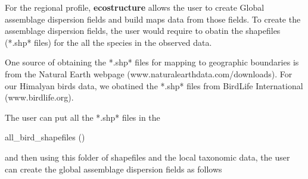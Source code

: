\documentclass[12pt]{article}
\begin{document}
For the regional profile, \textbf{ecostructure} allows the user to create Global assemblage dispersion fields and build maps data from those fields. To create the assemblage dispersion fields, the user would require to obatin the shapefiles (*.shp* files) for the all the species in the observed data.

One source of obtaining the *.shp* files for mapping to geographic boundaries is from the Natural Earth webpage (www.naturalearthdata.com/downloads). For our Himalyan birds data, we obatined the *.shp* files from BirdLife International (www.birdlife.org).

The user can put all the *.shp* files in the \begin{verb} all_bird_shapefiles () \end{verb} and then using this folder of shapefiles and the local taxonomic data, the user can create the global assemblage dispersion fields as follows

\begin{knitrout}
\color{fgcolor}\begin{kframe}
\begin{alltt}
 \hlkwb{<-} 
               \hlstd{=} \hlstd{)}
\end{alltt}
\end{kframe}
\end{knitrout}


\begin{knitrout}
\color{fgcolor}\begin{kframe}
\begin{alltt}
 \hlkwb{<-} \hlstd{(}\hlstd{(}\hlstd{,}
                    \hlstd{,}  \hlstd{=} \hlstd{))}
 \hlkwb{<-} \hlstd{(}\hlstd{)}
 \hlkwb{<-} \hlstd{(}\hlstd{(}\hlstd{,}
         \hlstd{,}
           \hlstd{=} \hlstd{),} 
 \hlkwb{<-} 
\end{alltt}
\end{kframe}
\end{knitrout}
\end{document}
